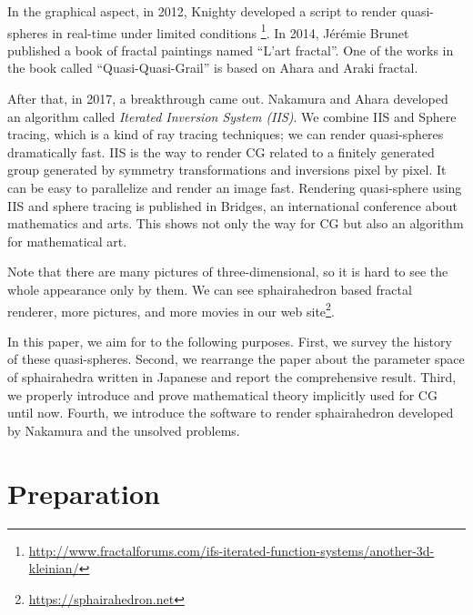 \documentclass[suppldata, dvipdfmx]{interact}
\theoremstyle{plain}%
\theoremstyle{definition}
\theoremstyle{remark}
\theoremstyle{problemstyle}
\begin{document}
In the graphical aspect, in 2012, Knighty developed a script to render
quasi-spheres in real-time under limited conditions
\footnote{\url{http://www.fractalforums.com/ifs-iterated-function-systems/another-3d-kleinian/}}.
In 2014, J\'er\'emie Brunet published a book of
fractal paintings named ``L'art fractal''. One of the works in the book called
``Quasi-Quasi-Grail'' is based on Ahara and Araki fractal.

After that, in 2017, a breakthrough came out. 
Nakamura and Ahara developed an algorithm called
\textit{Iterated Inversion System (IIS)}\cite{bridges2016}\cite{bridges2017}.
We combine IIS and Sphere tracing, which is a kind of ray tracing
techniques; we can render quasi-spheres dramatically fast.
IIS is the way to render CG related to a finitely generated group
generated by symmetry transformations and inversions pixel by pixel.
It can be easy to parallelize and render an image fast. 
Rendering quasi-sphere using IIS and sphere tracing is published in
Bridges\cite{bridges2018}, an international conference about mathematics
and arts.
This shows not only the way for CG but also an algorithm for mathematical art.

Note that there are many pictures of three-dimensional, so it is hard to
see the whole appearance only by them. We can see sphairahedron based
fractal renderer, more pictures, and more movies in
our web site\footnote{\url{https://sphairahedron.net}}.

In this paper, we aim for to the following purposes.
First, we survey the history of these quasi-spheres.
Second, we rearrange the paper about the parameter space of sphairahedra
written in Japanese and report the comprehensive result.
Third, we properly introduce and prove mathematical theory implicitly
used for CG until now.
Fourth, we introduce the software to render sphairahedron developed by
Nakamura and the unsolved problems. 

\section{Preparation}
\end{document}
